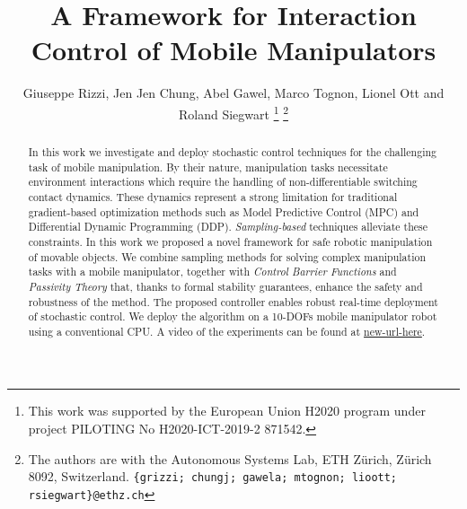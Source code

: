 \documentclass[letterpaper, 10 pt, conference]{ieeeconf}  %
\title{\LARGE \bf
A Framework for Interaction Control of Mobile Manipulators
}
\author{Giuseppe Rizzi, Jen Jen Chung, Abel Gawel, Marco Tognon, Lionel Ott and Roland Siegwart%
\thanks{This work was supported by the European Union H2020 program under project PILOTING No H2020-ICT-2019-2 871542.}
\thanks{The authors are with the Autonomous Systems Lab, ETH Z\"urich, Z\"urich 8092, Switzerland. {\tt\small\{grizzi; chungj; gawela; mtognon; lioott; rsiegwart\}@ethz.ch}}%
}
\begin{document}
\maketitle
\thispagestyle{empty}
\pagestyle{empty}


\begin{abstract}

In this work we investigate and deploy stochastic control techniques for the challenging task of mobile manipulation. By their nature, manipulation tasks necessitate environment interactions which require the handling of non-differentiable switching contact dynamics. These dynamics represent a strong limitation for traditional gradient-based optimization methods such as Model Predictive Control (MPC) and Differential Dynamic Programming (DDP). \emph{Sampling-based} techniques alleviate these constraints. In this work we proposed a novel framework for safe robotic manipulation of movable objects. We combine sampling methods for solving complex manipulation tasks with a mobile manipulator, together with \emph{Control Barrier Functions} and \emph{Passivity Theory} that, thanks to formal stability guarantees, enhance the safety and robustness of the method. The proposed controller enables robust real-time deployment of stochastic control. We deploy the algorithm on a 10-DOFs mobile manipulator robot using a conventional CPU. A video of the experiments can be found at \url{new-url-here}.
  
\end{abstract}


















\end{document}
